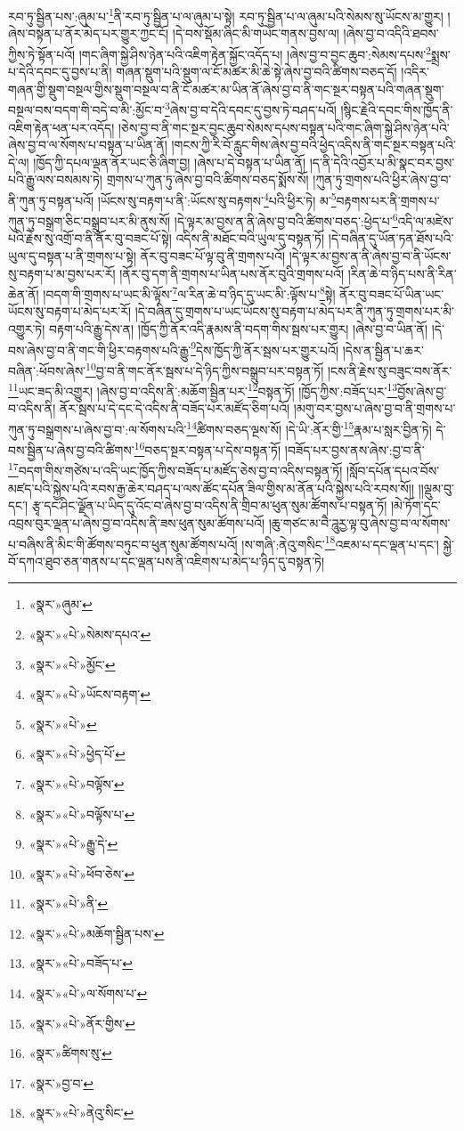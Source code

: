 རབ་ཏུ་སྦྱིན་པས་:ཞུམ་པ་\footnote{«སྣར་»ཞུམ་}ནི་རབ་ཏུ་སྦྱིན་པ་ལ་ཞུམ་པ་སྟེ། རབ་ཏུ་སྦྱིན་པ་ལ་ཞུམ་པའི་སེམས་སུ་ཡོངས་མ་གྱུར། །ཞེས་བསྟན་པ་ནོར་མེད་པར་གྱུར་ཀྱང་ངོ། །དེ་བས་སྡོམ་ཞིང་མི་གཡེང་གནས་བྱས་ལ། །ཞེས་བྱ་བ་འདིའི་ཐབས་ཀྱིས་ཏེ་སྟོན་པའོ། །གང་ཞིག་སྐྱེ་ཤིས་ཉེན་པའི་འཇིག་རྟེན་སྐྱོང་འདོད་པ། །ཞེས་བྱ་བ་བྱང་ཆུབ་:སེམས་དཔས་\footnote{«སྣར་»«པེ་»སེམས་དཔའ་}སྨྲས་པ་དེའི་དབང་དུ་བྱས་པ་ནི། གཞན་སྡུག་པའི་སྡུག་ལ་ངོ་མཚར་མི་ཆེ་སྟེ་ཞེས་བྱ་བའི་ཚིགས་བཅད་དོ། །འདིར་གཞན་གྱི་སྡུག་བསྔལ་གྱིས་སྡུག་བསྔལ་བ་ནི་ངོ་མཚར་མ་ཡིན་ནོ་ཞེས་བྱ་བ་ནི་གང་སྔར་བསྟན་པའི་གཞན་སྡུག་བསྔལ་བས་བདག་གི་བདེ་བ་མི་:མྱོང་བ་\footnote{«སྣར་»«པེ་»མྱོང་}ཞེས་བྱ་བ་དེའི་དབང་དུ་བྱས་ཏེ་བཤད་པའོ། །སྙིང་རྗེའི་དབང་གིས་ཁྱོད་ནི་འཇིག་རྟེན་ཕན་པར་འདོད། །ཅེས་བྱ་བ་ནི་གང་སྔར་བྱང་ཆུབ་སེམས་དཔས་བསྟན་པའི་གང་ཞིག་སྐྱེ་ཤིས་ཉེན་པའི་ཞེས་བྱ་བ་ལ་སོགས་པ་བསྟན་པ་ཡིན་ནོ། །གངས་ཀྱི་རི་བོ་རླུང་གིས་ཞེས་བྱ་བའི་ཕྱེད་འདིས་ནི་གང་སྔར་བསྟན་པའི་དེ་ལ། །ཁྱོད་ཀྱི་དཔལ་ལྡན་ནོར་ཡང་ཅི་ཞིག་བྱ། །ཞེས་པ་དེ་བསྟན་པ་ཡིན་ནོ། །ད་ནི་དེའི་འབྱོར་པ་མི་སྣང་བར་བྱས་པའི་རྒྱུ་ལས་བསམས་ཏེ། གྲགས་པ་ཀུན་ཏུ་ཞེས་བྱ་བའི་ཚིགས་བཅད་སྨོས་སོ། །ཀུན་ཏུ་གྲགས་པའི་ཕྱིར་ཞེས་བྱ་བ་ནི་ཀུན་ཏུ་བསྟན་པའོ། །ཡོངས་སུ་བརྟག་པ་ནི་:ཡོངས་སུ་བརྟགས་\footnote{«སྣར་»«པེ་»ཡོངས་བརྟག་}པའི་ཕྱིར་ཏེ། མ་\footnote{«སྣར་»«པེ་»}བརྟགས་པར་ནི་གྲགས་པ་ཀུན་ཏུ་བསྒྲག་ཅིང་བསྒྲུབ་པར་མི་ནུས་སོ། །དེ་ལྟར་མ་བྱས་ན་ནི་ཞེས་བྱ་བའི་ཚིགས་བཅད་:ཕྱེད་པ་\footnote{«སྣར་»«པེ་»ཕྱེད་པོ་}འདི་ལ་མཛེས་པའི་རྗེས་སུ་འགྲོ་བ་ནི་ནོར་བུ་བཟང་པོ་སྟེ། འདིས་ནི་མཐོང་བའི་ཡུལ་དུ་བསྟན་ཏོ། །དེ་བཞིན་དུ་ཡོན་ཏན་ཐོས་པའི་ཡུལ་དུ་བསྟན་པ་ནི་གྲགས་པ་སྟེ། ནོར་བུ་བཟང་པོ་ལྟ་བུ་ནི་གྲགས་པའོ། །དེ་ལྟར་མ་བྱས་ན་ནི་ཞེས་བྱ་བ་ནི་ཡོངས་སུ་བརྟག་པ་མ་བྱས་པར་རོ། །ནོར་བུ་དག་ནི་གྲགས་པ་ཡིན་པས་ནོར་བུའི་གྲགས་པའོ། །རིན་ཆེ་བ་ཉིད་པས་ནི་རིན་ཆེན་ནོ། །བདག་གི་གྲགས་པ་ཡང་མི་ལྟོས་\footnote{«སྣར་»«པེ་»བལྟོས་}ལ་རིན་ཆེ་བ་ཉིད་དུ་ཡང་མི་:ལྟོས་པ་\footnote{«སྣར་»«པེ་»བལྟོས་པ་}སྟེ། ནོར་བུ་བཟང་པོ་ཡིན་ཡང་ཡོངས་སུ་བརྟག་པ་མེད་པར་རོ། །དེ་བཞིན་དུ་གྲགས་པ་ཡང་ཡོངས་སུ་བརྟག་པ་མེད་པར་ནི་ཀུན་ཏུ་གྲགས་པར་མི་འགྱུར་ཏེ། བརྟག་པའི་རྒྱུ་དེས་ན། །ཁྱོད་ཀྱི་ནོར་འདི་རྣམས་ནི་བདག་གིས་སྦས་པར་གྱུར། །ཞེས་བྱ་བ་ཡིན་ནོ། །དེ་བས་ཞེས་བྱ་བ་ནི་གང་གི་ཕྱིར་བརྟགས་པའི་རྒྱུ་\footnote{«སྣར་»«པེ་»རྒྱུ་དེ་}དེས་ཁྱོད་ཀྱི་ནོར་སྦས་པར་གྱུར་པའོ། །དེས་ན་སྦྱིན་པ་ཆར་བཞིན་:ཕོབས་ཞེས་\footnote{«སྣར་»«པེ་»ཕོབ་ཅེས་}བྱ་བ་ནི་གང་ནོར་སྦས་པ་དེ་ཉིད་ཀྱིས་བསྒྲུབ་པར་བསྟན་ཏོ། །ངས་ནི་རྗེས་སུ་བཟུང་བས་ནོར་\footnote{«སྣར་»«པེ་»ནི་}ཡང་ཟད་མི་འགྱུར། །ཞེས་བྱ་བ་འདིས་ནི་:མཆོག་སྦྱིན་པར་\footnote{«སྣར་»«པེ་»མཆོག་སྦྱིན་པས་}བསྟན་ཏོ། །ཁྱོད་ཀྱིས་:བཟོད་པར་\footnote{«སྣར་»«པེ་»བཟོད་པ་}བྱོས་ཞེས་བྱ་བ་འདིས་ནི། ནོར་སྦས་པ་དེ་དང་དེ་འདིས་ནི་བཟོད་པར་མཛོད་ཅིག་པའོ། །མགུ་བར་བྱས་པ་ཞེས་བྱ་བ་ནི་གྲགས་པ་ཀུན་ཏུ་བསྒྲགས་པ་ཞེས་བྱ་བ་:ལ་སོགས་པའི་\footnote{«སྣར་»«པེ་»ལ་སོགས་པ་}ཚིགས་བཅད་ལྔས་སོ། །དེ་ཡི་:ནོར་གྱི་\footnote{«སྣར་»«པེ་»ནོར་གྱིས་}རྣམ་པ་སླར་བྱིན་ཏེ། དེ་བས་སྦྱིན་པ་ཞེས་བྱ་བའི་ཚིགས་\footnote{«སྣར་»ཚིགས་སུ་}བཅད་སྔར་བསྟན་པ་དེས་བསྟན་ཏོ། །བཟོད་པར་བྱས་ནས་ཞེས་:བྱ་བ་ནི་\footnote{«སྣར་»བྱ་བ་}བདག་གིས་གཙེས་པ་འདི་ཡང་ཁྱོད་ཀྱིས་བཟོད་པ་མཛོད་ཅེས་བྱ་བ་འདིས་བསྟན་ཏོ། །སློབ་དཔོན་དཔའ་བོས་མཛད་པའི་སྐྱེས་པའི་རབས་རྒྱ་ཆེར་བཤད་པ་ལས་ཚོང་དཔོན་ཟིལ་གྱིས་མ་ནོན་པའི་སྐྱེས་པའི་རབས་སོ།། །།ལྡུམ་བུ་དང་། རྩྭ་དང་ཤིང་ལྗོན་པ་ཡིད་དུ་འོང་བ་ཞེས་བྱ་བ་འདིས་ནི་གྲིབ་མ་ཕུན་སུམ་ཚོགས་པ་བསྟན་ཏོ། །མེ་ཏོག་དང་འབྲས་བུར་ལྡན་པ་ཞེས་བྱ་བ་འདིས་ནི་ཟས་ཕུན་སུམ་ཚོགས་པའོ། །ཆུ་གཙང་མ་བཻ་ཌཱུརྱ་ལྟ་བུ་ཞེས་བྱ་བ་ལ་སོགས་པ་བཞིས་ནི་མིང་གི་ཚོགས་བཏུང་བ་ཕུན་སུམ་ཚོགས་པའོ། །ས་གཞི་:ནེའུ་གསིང་\footnote{«སྣར་»«པེ་»ནེའུ་སིང་}འཇམ་པ་དང་ལྡན་པ་དང་། སྐྱེ་བོ་དཀའ་ཐུབ་ཅན་གནས་པ་དང་ལྡན་པས་ནི་འཇིགས་པ་མེད་པ་ཉིད་དུ་བསྟན་ཏེ། 